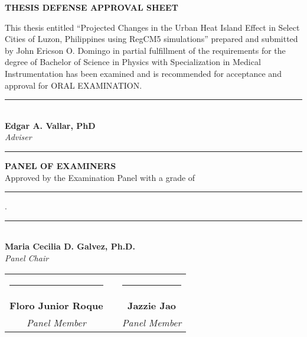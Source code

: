 	{
	\thispagestyle{empty}
	
\begin{center}
	\textbf{THESIS DEFENSE APPROVAL SHEET}
\end{center}



This thesis entitled 
``Projected Changes in the Urban Heat Island Effect in Select Cities of Luzon, Philippines using RegCM5 simulations''
prepared and submitted by
John \mbox{Ericson} O. Domingo
in partial fulfillment of the requirements for the degree of  Bachelor of Science in Physics with Specialization in Medical Instrumentation
has been examined and is recommended for acceptance and approval for ORAL EXAMINATION. 

\vspace{4ex}

\begin{center}
	\rule{5cm}{.4pt}\\
	\textbf{Edgar A. Vallar, PhD} \\
	\textit{Adviser} \\
\end{center}

\vspace{3ex}
\hrule
\vspace{3ex}

\begin{center}
	\textbf{PANEL OF EXAMINERS}\\
	Approved by the Examination Panel with a grade of \rule{1cm}{.4pt}.\\

	\vspace{5ex}
	
	\rule{5cm}{.4pt}\\
	\textbf{Maria Cecilia D. Galvez, Ph.D.}\\
	\textit{Panel Chair} \\
	\vfill

	\begin{tabular}{c c c}
		\rule{5cm}{.4pt} & \hspace {10em} & \rule{5cm}{.4pt}\\
		\textbf{Floro Junior Roque} & & \textbf{Jazzie Jao}\\ 
		\textit{Panel Member} & & \textit{Panel Member} \\
	\end{tabular}
\end{center}				

}
